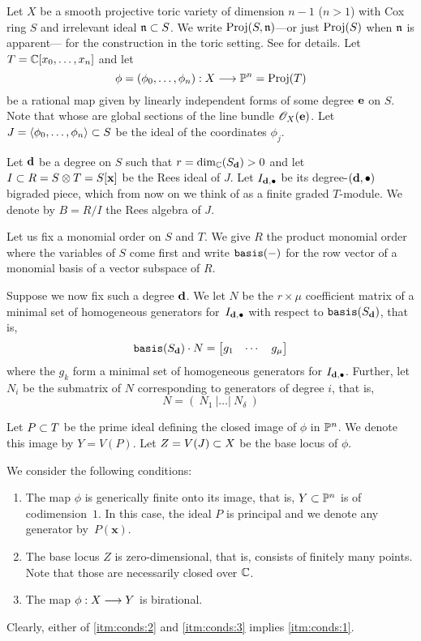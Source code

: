 \documentclass[fleqn,reqno]{amsart}
\begin{document}
\begin{paragraf}
\label{par:again}
\label{par:setup}
Let $X$ be a smooth projective toric variety of dimension $n-1$ ($n>1$)
with Cox ring $S$ and irrelevant ideal $\mathfrak{n}\subset S$.
We write $\operatorname{Proj}(S,\mathfrak{n})$---or just $\operatorname{Proj}(S)$ when $\mathfrak{n}$ is apparent---%
for the construction in the toric setting.
See \citet{Cox-93} for details.
Let $T=\mathbb{C}[x_0,\ldots,x_n]$ and let
\[
	\phi=(\phi_0,\ldots,\phi_n):X\longrightarrow\mathbb{P}^n=\operatorname{Proj}(T)
\]
be a rational map given by linearly independent forms of some degree $\mathbf e$ on $S$.
Note that whose are global sections of the line bundle $\mathscr{O}_X(\mathbf e)$.
Let $J=\langle \phi_0,\ldots,\phi_n\rangle\subset S$ be the ideal of the coordinates $\phi_j$.

Let $\mathbf d$ be a degree on $S$ such that $r=\dim_{\mathbb{C}}(S_\mathbf d)>0$ and
let $I\subset R=S\otimes T=S[\mathbf x]$ be the Rees ideal of $J$.
Let $I_{\mathbf d,\bullet}$ be its degree-$(\mathbf d,\bullet)$ bigraded piece,
which from now on we think of as a finite graded $T$-module.
We denote by $B=R/I$ the Rees algebra of $J$.

Let us fix a monomial order on $S$ and $T$.
We give $R$ the product monomial order where the variables of $S$ come first
and write $\mathop{\tt basis}(-)$ for the row vector of a monomial basis of a vector subspace of $R$.

Suppose we now fix such a degree $\mathbf d$.
We let $N$ be the $r\times\mu$ coefficient matrix of
a minimal set of homogeneous generators for~$I_{\mathbf d,\bullet}$ with respect to $\mathop{\tt basis}(S_\mathbf d)$,
that is,
\[
	\mathop{\tt basis}(S_\mathbf d)\cdot N=\begin{bmatrix}g_1&\cdots& g_\mu\end{bmatrix}
\]
where the $g_k$ form a minimal set of homogeneous generators for $I_{\mathbf d,\bullet}$.
Further, let $N_i$ be the submatrix of $N$ corresponding to generators of degree $i$,
that is,
\[
	N=(~N_1~|\ldots|~N_\delta~)
\]
\end{paragraf}

\begin{paragraf}
\label{par:conds}
Let $P\subset T$ be the prime ideal defining the closed image of $\phi$ in $\mathbb{P}^n$.
We denote this image by $Y=V(P)$.
Let $Z=V(J)\subset X$ be the base locus of $\phi$.

We consider the following conditions:
\begin{enumerate}
\item
\label{itm:conds:1}
The map $\phi$ is generically finite onto its image, that is,
$Y\subset\mathbb{P}^n$ is of codimension~$1$.
In this case, the ideal $P$ is principal and
we denote any generator by~$P(\mathbf x)$.

\item
\label{itm:conds:2} The base locus $Z$ is zero-dimensional, that is,
consists of finitely many points.
Note that those are necessarily closed over $\mathbb{C}$.

\item
\label{itm:conds:3} The map $\phi:X\longrightarrow Y$ is birational.
\end{enumerate}

Clearly, either of \eqref{itm:conds:2} and \eqref{itm:conds:3} implies \eqref{itm:conds:1}.
\end{paragraf}
\end{document}
